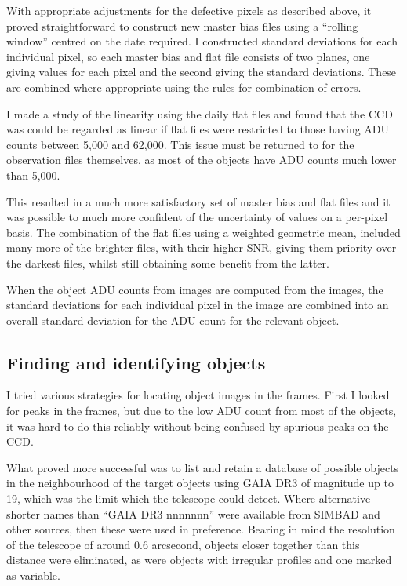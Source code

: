 With appropriate adjustments for the defective pixels as described above, it
proved straightforward to construct new master bias files using a  ``rolling
window'' centred on the date required. I constructed standard deviations for
each individual pixel, so each master bias and flat file consists of two planes,
one giving values for each pixel and the second giving the standard deviations.
These are combined where appropriate using the rules for combination of errors.

I made a study of the linearity using the daily flat files and found that the
CCD was could be regarded as linear if flat files were restricted to those
having ADU counts between 5,000 and 62,000. This issue must be returned to for
the observation files themselves, as most of the objects have ADU counts much
lower than 5,000.

This resulted in a much more satisfactory set of master bias and flat files and
it was possible to much more confident of the uncertainty of values on a
per-pixel basis. The combination of the flat files using a weighted
geometric mean, included many more of the brighter files, with their higher
SNR, giving them priority over the darkest files, whilst still obtaining some
benefit from the latter.

When the object ADU counts from {\rem} images are computed from the images, the
standard deviations for each individual pixel in the image are combined into an
overall standard deviation for the ADU count for the relevant object.

\subsection{Finding and identifying objects}
\protect\label{section:findingidentify}

I tried various strategies for locating object images in the frames. First I
looked for peaks in the frames, but due to the low ADU count from most of the
objects, it was hard to do this reliably without being confused by spurious
peaks on the CCD.

What proved more successful was to list and retain a database of possible
objects in the neighbourhood of the target objects using GAIA DR3 of magnitude
up to 19, which was the limit which the {\rem} telescope could detect.
Where alternative shorter names than ``GAIA DR3 nnnnnnn'' were available from SIMBAD
and other sources, then these were used in preference. Bearing in mind the
resolution of the {\rem} telescope of around 0.6 arcsecond, objects closer together than this
distance were eliminated, as were objects with irregular profiles and one marked
as variable.

